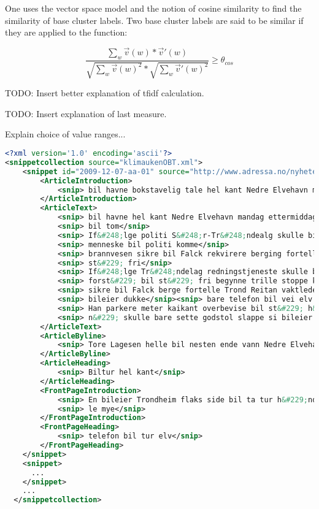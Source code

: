 One uses the vector space model and the notion of cosine similarity to find the similarity of base cluster labels. Two base cluster labels are said to be similar if they are applied to the function:

\begin{displaymath}
\frac{\sum_{w}\vec{v}(w) * \vec{v}'(w)}
{\sqrt{\sum_{w}\vec{v}(w)^2} * \sqrt{\sum_{w}\vec{v}'(w)^2}}
\ge \theta_{cos}
\end{displaymath}

TODO: Insert better explanation of tfidf calculation.

TODO: Insert explanation of last measure.

Explain choice of value ranges...

%

\begin{lstlisting}[float=f, language=xml, breaklines=true, label=lst:snippetfile, caption={Snippet file encoded in XML}]
<?xml version='1.0' encoding='ascii'?>
<snippetcollection source="klimaukenOBT.xml">
    <snippet id="2009-12-07-aa-01" source="http://www.adressa.no/nyheter/trondheim/article1419658.ece" tags="Innenriks-ulykker-trafikk-utforkj&#248;ring-trondheim">
        <ArticleIntroduction>
            <snip> bil havne bokstavelig tale hel kant Nedre Elvehavn mandag ettermiddag</snip>
        </ArticleIntroduction>
        <ArticleText>
            <snip> bil havne hel kant Nedre Elvehavn mandag ettermiddag</snip>
            <snip> bil tom</snip>
            <snip> If&#248;lge politi S&#248;r-Tr&#248;ndealg skulle bil tom komme sted</snip>
            <snip> menneske bil politi komme</snip>
            <snip> brannvesen sikre bil Falck rekvirere berging fortelle Curt Ivar R&#248;hmen operasjonsleder S&#248;r-Tr&#248;ndelag politidistrikt</snip>
            <snip> st&#229; fri</snip>
            <snip> If&#248;lge Tr&#248;ndelag redningstjeneste skulle bil begynne rulle h&#229;nd</snip>
            <snip> forst&#229; bil st&#229; fri begynne trille stoppe kant</snip>
            <snip> sikre bil Falck berge fortelle Trond Reitan vaktleder 110-sentral</snip>
            <snip> bileier dukke</snip><snip> bare telefon bil vei elv si Tore Lagesen</snip>
            <snip> Han parkere meter kaikant overbevise bil st&#229; h&#229;ndbrekk</snip>
            <snip> n&#229; skulle bare sette godstol slappe si bileier hvilepuls</snip>
        </ArticleText>
        <ArticleByline>
            <snip> Tore Lagesen helle bil nesten ende vann Nedre Elvehavn</snip>
        </ArticleByline>
        <ArticleHeading>
            <snip> Biltur hel kant</snip>
        </ArticleHeading>
        <FrontPageIntroduction>
            <snip> En bileier Trondheim flaks side bil ta tur h&#229;nd mandag ettermiddag</snip>
            <snip> le mye</snip>
        </FrontPageIntroduction>
        <FrontPageHeading>
            <snip> telefon bil tur elv</snip>
        </FrontPageHeading>
    </snippet>
    <snippet>
      ...
    </snippet>
    ...
  </snippetcollection>
\end{lstlisting}

